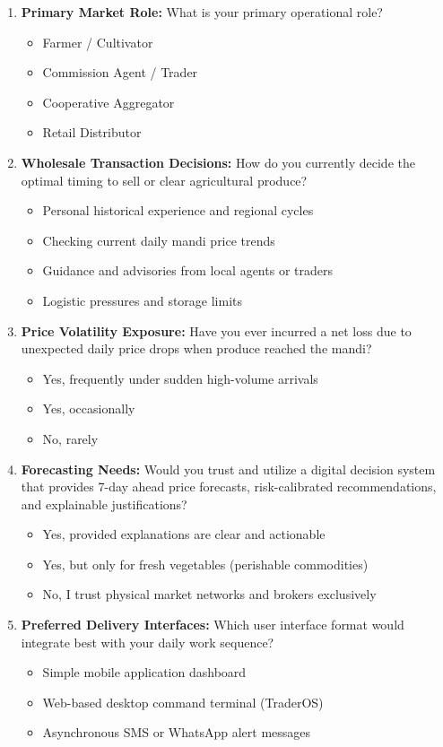 \documentclass[12pt,a4paper]{report}
\theoremstyle{definition}
\theoremstyle{remark}
\begin{document}
\begin{enumerate}
    \item \textbf{Primary Market Role:} What is your primary operational role?
    \begin{itemize}
        \item Farmer / Cultivator
        \item Commission Agent / Trader
        \item Cooperative Aggregator
        \item Retail Distributor
    \end{itemize}

    \item \textbf{Wholesale Transaction Decisions:} How do you currently decide the optimal timing to sell or clear agricultural produce?
    \begin{itemize}
        \item Personal historical experience and regional cycles
        \item Checking current daily mandi price trends
        \item Guidance and advisories from local agents or traders
        \item Logistic pressures and storage limits
    \end{itemize}

    \item \textbf{Price Volatility Exposure:} Have you ever incurred a net loss due to unexpected daily price drops when produce reached the mandi?
    \begin{itemize}
        \item Yes, frequently under sudden high-volume arrivals
        \item Yes, occasionally
        \item No, rarely
    \end{itemize}

    \item \textbf{Forecasting Needs:} Would you trust and utilize a digital decision system that provides 7-day ahead price forecasts, risk-calibrated recommendations, and explainable justifications?
    \begin{itemize}
        \item Yes, provided explanations are clear and actionable
        \item Yes, but only for fresh vegetables (perishable commodities)
        \item No, I trust physical market networks and brokers exclusively
    \end{itemize}

    \item \textbf{Preferred Delivery Interfaces:} Which user interface format would integrate best with your daily work sequence?
    \begin{itemize}
        \item Simple mobile application dashboard
        \item Web-based desktop command terminal (TraderOS)
        \item Asynchronous SMS or WhatsApp alert messages
    \end{itemize}
\end{enumerate}
\end{document}
